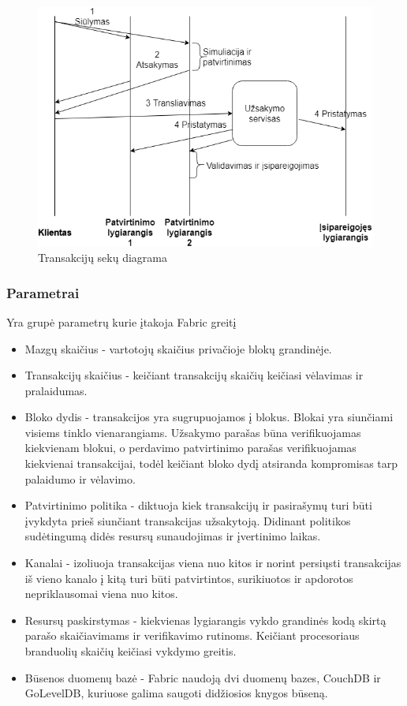 \documentclass{VUMIFPSkursinis}
\begin{document}
\begin{figure}[H]
\centering
\includegraphics[scale=0.5]{img/MLP}
\caption{Transakcijų sekų diagrama} %
\label{img:mlp}
\end{figure}
\subsubsection{Parametrai}
Yra grupė parametrų \cite{IMBResearch} kurie įtakoja Fabric greitį 
\begin{itemize}
\item{Mazgų skaičius - vartotojų skaičius privačioje blokų grandinėje.}
\item{Transakcijų skaičius - keičiant transakcijų skaičių keičiasi vėlavimas ir pralaidumas.}
\item{Bloko dydis - transakcijos yra sugrupuojamos į blokus. Blokai yra siunčiami visiems tinklo vienarangiams. Užsakymo parašas 
būna verifikuojamas kiekvienam blokui, o perdavimo patvirtinimo parašas verifikuojamas kiekvienai transakcijai, todėl keičiant bloko dydį atsiranda kompromisas tarp palaidumo ir vėlavimo.}
\item{Patvirtinimo politika - diktuoja kiek transakcijų ir pasirašymų turi būti įvykdyta prieš siunčiant transakcijas užsakytoją. Didinant politikos sudėtingumą didės resursų sunaudojimas ir įvertinimo laikas.}
\item{Kanalai - izoliuoja transakcijas viena nuo kitos ir norint persiųsti transakcijas iš vieno kanalo į kitą turi būti patvirtintos, surikiuotos ir apdorotos nepriklausomai viena nuo kitos.}
\item{Resursų paskirstymas - kiekvienas lygiarangis vykdo grandinės kodą skirtą parašo skaičiavimams ir verifikavimo rutinoms. Keičiant procesoriaus branduolių skaičių keičiasi vykdymo greitis.}
\item{Būsenos duomenų bazė - Fabric naudoją dvi duomenų bazes, CouchDB ir GoLevelDB, kuriuose galima saugoti didžiosios knygos būseną.}
\end{itemize}
\end{document}
